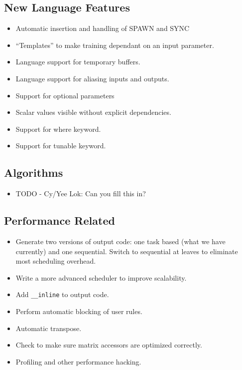 \documentclass[11pt]{article}
\begin{document}
\subsection{New Language Features}
\begin{itemize}

\item Automatic insertion and handling of SPAWN and SYNC

\item ``Templates'' to make training dependant on an input parameter.

\item Language support for temporary buffers.

\item Language support for aliasing inputs and outputs.

\item Support for optional parameters

\item Scalar values visible without explicit dependencies.

\item Support for where keyword.

\item Support for tunable keyword.

\end{itemize}

\subsection{Algorithms}
\begin{itemize}

\item TODO - Cy/Yee Lok: Can you fill this in?

\end{itemize}

\subsection{Performance Related}
\begin{itemize}

\item Generate two versions of output code:  one task based (what we have
    currently) and one sequential. Switch to sequential at leaves to
    eliminate most scheduling overhead.
  
\item Write a more advanced scheduler to improve scalability.

\item Add {\tt \_\_inline} to output code.

\item Perform automatic blocking of user rules.

\item Automatic transpose.

\item Check to make sure matrix accessors are optimized correctly.

\item Profiling and other performance hacking.

\end{itemize}
\end{document}
